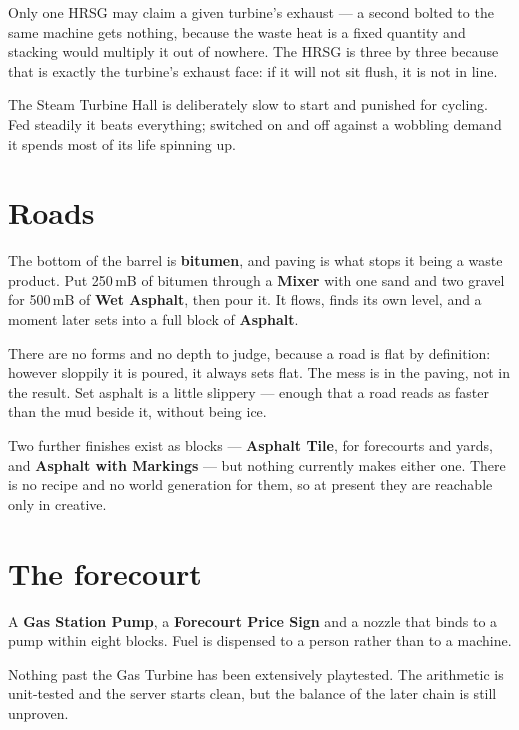 \begin{ietip}
Only one HRSG may claim a given turbine's exhaust --- a second bolted to the same machine gets
nothing, because the waste heat is a fixed quantity and stacking would multiply it out of nowhere.
The HRSG is three by three because that is exactly the turbine's exhaust face: if it will not sit
flush, it is not in line.
\end{ietip}

\begin{iewarning}
The Steam Turbine Hall is deliberately slow to start and punished for cycling. Fed steadily it
beats everything; switched on and off against a wobbling demand it spends most of its life
spinning up.
\end{iewarning}

\section{Roads}

The bottom of the barrel is \textbf{bitumen}, and paving is what stops it being a waste product.
Put 250\,mB of bitumen through a \textbf{Mixer} with one sand and two gravel for 500\,mB of
\textbf{Wet Asphalt}, then pour it. It flows, finds its own level, and a moment later sets into a
full block of \textbf{Asphalt}.

There are no forms and no depth to judge, because a road is flat by definition: however sloppily it
is poured, it always sets flat. The mess is in the paving, not in the result. Set asphalt is a
little slippery --- enough that a road reads as faster than the mud beside it, without being ice.

\begin{iewarning}
Two further finishes exist as blocks --- \textbf{Asphalt Tile}, for forecourts and yards, and
\textbf{Asphalt with Markings} --- but nothing currently makes either one. There is no recipe and
no world generation for them, so at present they are reachable only in creative.
\end{iewarning}

\section{The forecourt}

A \textbf{Gas Station Pump}, a \textbf{Forecourt Price Sign} and a nozzle that binds to a pump
within eight blocks. Fuel is dispensed to a person rather than to a machine.

\begin{iewarning}
Nothing past the Gas Turbine has been extensively playtested. The arithmetic is unit-tested and the
server starts clean, but the balance of the later chain is still unproven.
\end{iewarning}
